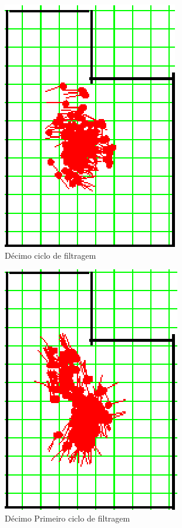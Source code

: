 \begin{figure}[H]
  \centering
  \includegraphics[scale=1]{figuras/cen1_ex3/11.eps}
  \caption[Décimo Ciclo de Filtragem]{Décimo ciclo de filtragem}
  \label{img:cen1_ex3_11}
\end{figure}

\begin{figure}[H]
  \centering
  \includegraphics[scale=1]{figuras/cen1_ex3/12.eps}
  \caption[Décimo Primeiro Ciclo de Filtragem]{Décimo Primeiro ciclo de filtragem}
  \label{img:cen1_ex3_12}
\end{figure}

